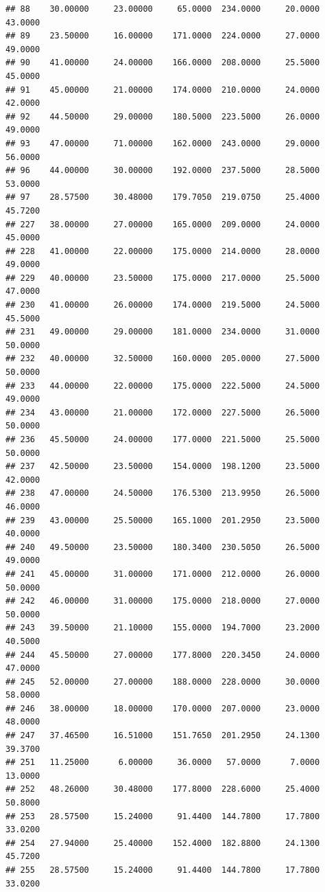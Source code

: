 \documentclass[]{article}
\begin{document}
\begin{verbatim}
## 88    30.00000     23.00000     65.0000  234.0000     20.0000       43.0000
## 89    23.50000     16.00000    171.0000  224.0000     27.0000       49.0000
## 90    41.00000     24.00000    166.0000  208.0000     25.5000       45.0000
## 91    45.00000     21.00000    174.0000  210.0000     24.0000       42.0000
## 92    44.50000     29.00000    180.5000  223.5000     26.0000       49.0000
## 93    47.00000     71.00000    162.0000  243.0000     29.0000       56.0000
## 96    44.00000     30.00000    192.0000  237.5000     28.5000       53.0000
## 97    28.57500     30.48000    179.7050  219.0750     25.4000       45.7200
## 227   38.00000     27.00000    165.0000  209.0000     24.0000       45.0000
## 228   41.00000     22.00000    175.0000  214.0000     28.0000       49.0000
## 229   40.00000     23.50000    175.0000  217.0000     25.5000       47.0000
## 230   41.00000     26.00000    174.0000  219.5000     24.5000       45.5000
## 231   49.00000     29.00000    181.0000  234.0000     31.0000       50.0000
## 232   40.00000     32.50000    160.0000  205.0000     27.5000       50.0000
## 233   44.00000     22.00000    175.0000  222.5000     24.5000       49.0000
## 234   43.00000     21.00000    172.0000  227.5000     26.5000       50.0000
## 236   45.50000     24.00000    177.0000  221.5000     25.5000       50.0000
## 237   42.50000     23.50000    154.0000  198.1200     23.5000       42.0000
## 238   47.00000     24.50000    176.5300  213.9950     26.5000       46.0000
## 239   43.00000     25.50000    165.1000  201.2950     23.5000       40.0000
## 240   49.50000     23.50000    180.3400  230.5050     26.5000       49.0000
## 241   45.00000     31.00000    171.0000  212.0000     26.0000       50.0000
## 242   46.00000     31.00000    175.0000  218.0000     27.0000       50.0000
## 243   39.50000     21.10000    155.0000  194.7000     23.2000       40.5000
## 244   45.50000     27.00000    177.8000  220.3450     24.0000       47.0000
## 245   52.00000     27.00000    188.0000  228.0000     30.0000       58.0000
## 246   38.00000     18.00000    170.0000  207.0000     23.0000       48.0000
## 247   37.46500     16.51000    151.7650  201.2950     24.1300       39.3700
## 251   11.25000      6.00000     36.0000   57.0000      7.0000       13.0000
## 252   48.26000     30.48000    177.8000  228.6000     25.4000       50.8000
## 253   28.57500     15.24000     91.4400  144.7800     17.7800       33.0200
## 254   27.94000     25.40000    152.4000  182.8800     24.1300       45.7200
## 255   28.57500     15.24000     91.4400  144.7800     17.7800       33.0200

\end{verbatim}
\end{document}
